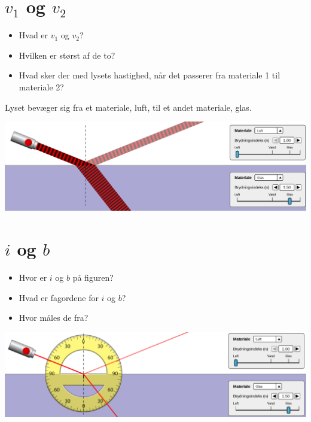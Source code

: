 \documentclass[a4paper, 12pt]{article}
\begin{document}
\vfill
\newpage


\section*{\(v_1\) og \(v_2\)}
\label{sec:org915d1f4}

\begin{minipage}{0.3\linewidth}
\begin{itemize}
\item Hvad er \(v_1\) og \(v_2\)?
\item Hvilken er størst af de to?
\item Hvad sker der med lysets hastighed, når det passerer fra materiale 1 til materiale 2?
\end{itemize}
\end{minipage}
\vline
\begin{minipage}{0.68\linewidth}
Lyset bevæger sig fra et materiale, luft, til et andet materiale, glas.
\begin{center}
\includegraphics[width=.9\linewidth]{./img/laser_luft_glas.png}
\end{center}  
\end{minipage}


\vfill

\section*{\(i\) og \(b\)}
\label{sec:org860f0ce}

\begin{minipage}{0.3\linewidth}
\begin{itemize}
\item Hvor er \(i\) og \(b\) på figuren?
\item Hvad er fagordene for \(i\) og \(b\)?
\item Hvor måles de fra?
\end{itemize}
\end{minipage}
\vline
\begin{minipage}{0.68\linewidth}
\begin{center}
\includegraphics[width=.9\linewidth]{./img/laser_luft_glas_vinkel.png}
\end{center}
\end{minipage}
\end{document}
